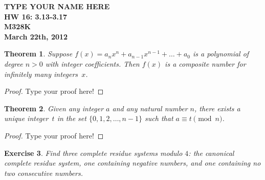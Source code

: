 \documentclass[12pt,leqno]{article}
\numberwithin{equation}{section}
\newtheorem{thm}{Theorem}[section]
\newtheorem{exer}[thm]{Exercise}
\theoremstyle{definition}
\begin{document}
\thispagestyle{plain}
\begin{flushright}
\large{\textbf{TYPE YOUR NAME HERE \\
HW 16: 3.13-3.17\\
M328K \\
March 22th, 2012 \\}}
\end{flushright}

\markboth{}{} \setcounter{section}{0} \baselineskip=18pt

\setcounter{tocdepth}{4}



\setcounter{section}{3}

\setcounter{thm}{12}

\begin{thm}
Suppose $f(x) = a_nx^n + a_{n-1}x^{n-1} + \hdots + a_0$ is a
polynomial of degree $n > 0$ with integer coefficients.  Then $f(x)$
is a composite number for infinitely many integers~$x$.
\end{thm}

\begin{proof}[Proof]
Type your proof here!
\end{proof}

\begin{thm}Given any integer $a$ and any natural number $n$, there exists a unique integer~$t$ in the set $\{0, 1, 2, \hdots, n - 1\}$ such that $a \equiv t \pmod{n}$.
\end{thm}

\begin{proof}[Proof]
Type your proof here!
\end{proof}



\begin{exer}
Find three complete residue systems modulo $4$: the canonical
complete residue system, one containing negative numbers, and one
containing no two consecutive numbers.
\end{exer}
\end{document}
